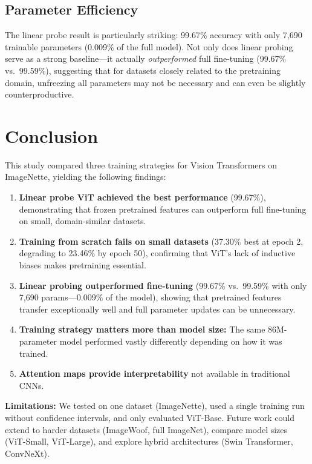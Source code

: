 \documentclass[12pt]{article}
\begin{document}
\subsection{Parameter Efficiency}

The linear probe result is particularly striking: 99.67\% accuracy with only 7,690 trainable parameters (0.009\% of the full model). Not only does linear probing serve as a strong baseline---it actually \textit{outperformed} full fine-tuning (99.67\% vs.\ 99.59\%), suggesting that for datasets closely related to the pretraining domain, unfreezing all parameters may not be necessary and can even be slightly counterproductive.

\section{Conclusion}

This study compared three training strategies for Vision Transformers on ImageNette, yielding the following findings:

\begin{enumerate}
    \item \textbf{Linear probe ViT achieved the best performance} (99.67\%), demonstrating that frozen pretrained features can outperform full fine-tuning on small, domain-similar datasets.
    \item \textbf{Training from scratch fails on small datasets} (37.30\% best at epoch 2, degrading to 23.46\% by epoch 50), confirming that ViT's lack of inductive biases makes pretraining essential.
    \item \textbf{Linear probing outperformed fine-tuning} (99.67\% vs.\ 99.59\% with only 7,690 params---0.009\% of the model), showing that pretrained features transfer exceptionally well and full parameter updates can be unnecessary.
    \item \textbf{Training strategy matters more than model size:} The same 86M-parameter model performed vastly differently depending on how it was trained.
    \item \textbf{Attention maps provide interpretability} not available in traditional CNNs.
\end{enumerate}

\textbf{Limitations:} We tested on one dataset (ImageNette), used a single training run without confidence intervals, and only evaluated ViT-Base. Future work could extend to harder datasets (ImageWoof, full ImageNet), compare model sizes (ViT-Small, ViT-Large), and explore hybrid architectures (Swin Transformer, ConvNeXt).
\end{document}
